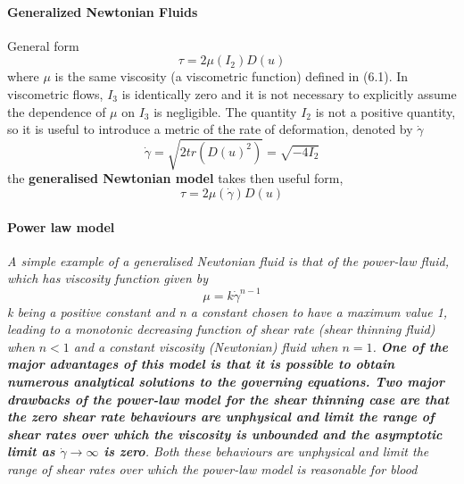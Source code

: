 \documentclass[11pt,letterpaper]{article}
\begin{document}
\paragraph{Generalized Newtonian Fluids}
General form 
\begin{equation}
    \tau = 2 \mu(I_2) D(u)
\end{equation}
where $\mu$ is the same viscosity (a viscometric function) defined in (6.1). In viscometric flows, $I_3$ is identically zero and it is not necessary to explicitly assume the dependence of  $\mu$  on  $I_3$ is negligible. The quantity  $I_2$ is not a positive quantity, so it is useful to introduce a metric of the rate of deformation, denoted by $\Dot{\gamma} $
\begin{equation}
    \Dot{\gamma} = \sqrt{2 tr(D(u)^2)} = \sqrt{-4I_2} 
\end{equation}
the \textbf{generalised Newtonian model} takes then useful form, 
\begin{equation}
    \tau = 2 \mu(  \Dot{\gamma}) D(u)
\end{equation}

\paragraph{Power law model}\textit{A simple example of a generalised Newtonian fluid is that of the power-law fluid, which has viscosity function given by
\begin{equation}
    \mu = k \Dot{\gamma}^{n-1}
\end{equation}
k being a positive constant and n a constant chosen to have a maximum value 1, leading to a monotonic decreasing function of shear rate (shear thinning fluid) when $n< 1$ and a constant viscosity (Newtonian) fluid when $n =1$. \textbf{One of the major advantages of this model is that it is possible to obtain numerous analytical solutions to the governing equations. Two major drawbacks of the power-law model for the shear thinning case are that the zero shear rate behaviours are unphysical and limit the range of shear rates over which the viscosity is unbounded and the asymptotic limit as $\Dot{\gamma}\longrightarrow \infty$ is zero}. {\color{red}Both these behaviours are unphysical and limit the range of shear rates over which the power-law model is reasonable for blood}
}
\end{document}

